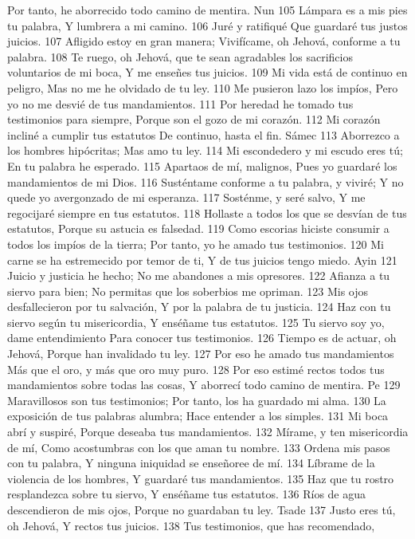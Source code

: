 Por tanto, he aborrecido todo camino de mentira.
Nun
105 Lámpara es a mis pies tu palabra,
Y lumbrera a mi camino.
106 Juré y ratifiqué
Que guardaré tus justos juicios.
107 Afligido estoy en gran manera;
Vivifícame, oh Jehová, conforme a tu palabra.
108 Te ruego, oh Jehová, que te sean agradables los sacrificios voluntarios de mi boca,
Y me enseñes tus juicios.
109 Mi vida está de continuo en peligro,
Mas no me he olvidado de tu ley.
110 Me pusieron lazo los impíos,
Pero yo no me desvié de tus mandamientos.
111 Por heredad he tomado tus testimonios para siempre,
Porque son el gozo de mi corazón.
112 Mi corazón incliné a cumplir tus estatutos
De continuo, hasta el fin.
Sámec
113 Aborrezco a los hombres hipócritas;
Mas amo tu ley.
114 Mi escondedero y mi escudo eres tú;
En tu palabra he esperado.
115 Apartaos de mí, malignos,
Pues yo guardaré los mandamientos de mi Dios.
116 Susténtame conforme a tu palabra, y viviré;
Y no quede yo avergonzado de mi esperanza.
117 Sosténme, y seré salvo,
Y me regocijaré siempre en tus estatutos.
118 Hollaste a todos los que se desvían de tus estatutos,
Porque su astucia es falsedad.
119 Como escorias hiciste consumir a todos los impíos de la tierra;
Por tanto, yo he amado tus testimonios.
120 Mi carne se ha estremecido por temor de ti,
Y de tus juicios tengo miedo.
Ayin
121 Juicio y justicia he hecho;
No me abandones a mis opresores.
122 Afianza a tu siervo para bien;
No permitas que los soberbios me opriman.
123 Mis ojos desfallecieron por tu salvación,
Y por la palabra de tu justicia.
124 Haz con tu siervo según tu misericordia,
Y enséñame tus estatutos.
125 Tu siervo soy yo, dame entendimiento
Para conocer tus testimonios.
126 Tiempo es de actuar, oh Jehová,
Porque han invalidado tu ley.
127 Por eso he amado tus mandamientos
Más que el oro, y más que oro muy puro.
128 Por eso estimé rectos todos tus mandamientos sobre todas las cosas,
Y aborrecí todo camino de mentira.
Pe
129 Maravillosos son tus testimonios;
Por tanto, los ha guardado mi alma.
130 La exposición de tus palabras alumbra;
Hace entender a los simples.
131 Mi boca abrí y suspiré,
Porque deseaba tus mandamientos.
132 Mírame, y ten misericordia de mí,
Como acostumbras con los que aman tu nombre.
133 Ordena mis pasos con tu palabra,
Y ninguna iniquidad se enseñoree de mí.
134 Líbrame de la violencia de los hombres,
Y guardaré tus mandamientos.
135 Haz que tu rostro resplandezca sobre tu siervo,
Y enséñame tus estatutos.
136 Ríos de agua descendieron de mis ojos,
Porque no guardaban tu ley.
Tsade
137 Justo eres tú, oh Jehová,
Y rectos tus juicios.
138 Tus testimonios, que has recomendado,
